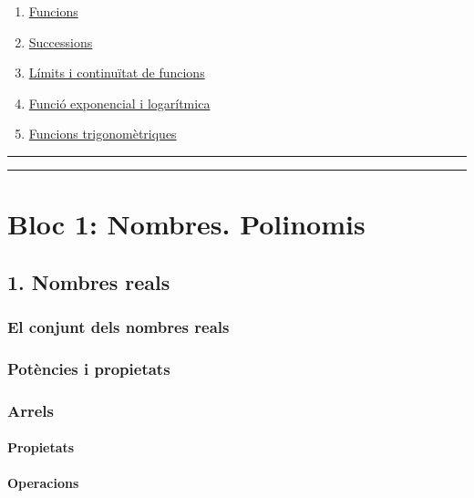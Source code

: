 \documentclass[]{article}
\providecommand{\tightlist}{%
  \setlength{\itemsep}{0pt}\setlength{\parskip}{0pt}}
\let\oldparagraph\paragraph
\renewcommand{\paragraph}[1]{\oldparagraph{#1}\mbox{}}
\begin{document}
\begin{enumerate}
\def\labelenumi{\arabic{enumi}.}
\setcounter{enumi}{7}
\tightlist
\item
  \hyperref[tema8]{Funcions}
\item
  \hyperref[tema9]{Successions}
\item
  \hyperref[tema10]{Límits i continuïtat de funcions}
\item
  \hyperref[tema11]{Funció exponencial i logarítmica}
\item
  \hyperref[tema12]{Funcions trigonomètriques}
\end{enumerate}

\begin{center}\rule{0.5\linewidth}{\linethickness}\end{center}

\begin{center}\rule{0.5\linewidth}{\linethickness}\end{center}

\section{Bloc 1: Nombres. Polinomis}\label{bloc-1-nombres.-polinomis}

\subsection{1. Nombres reals}\label{nombres-reals}

\subsubsection{El conjunt dels nombres
reals}\label{el-conjunt-dels-nombres-reals}

\subsubsection{Potències i propietats}\label{potuxe8ncies-i-propietats}

\subsubsection{Arrels}\label{arrels}

\paragraph{Propietats}\label{propietats}

\paragraph{Operacions}\label{operacions}
\end{document}

